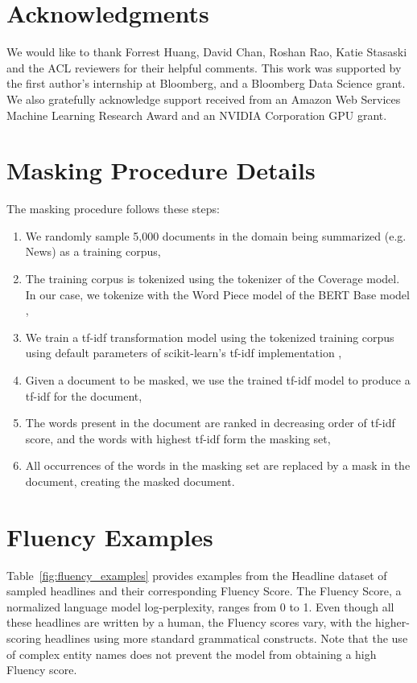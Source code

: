 \documentclass[11pt,a4paper]{article}
\begin{document}
\section*{Acknowledgments}

We would like to thank Forrest Huang, David Chan, Roshan Rao, Katie Stasaski and the ACL reviewers for their helpful comments. This work was supported by the first author's internship at Bloomberg, and a Bloomberg Data Science grant. We also gratefully acknowledge support received from an Amazon Web Services Machine Learning Research Award and an NVIDIA Corporation GPU grant.




\clearpage
\appendix
\renewcommand{\thetable}{A\arabic{table}}
\setcounter{table}{0}
\renewcommand{\thefigure}{A\arabic{figure}}
\setcounter{figure}{0}

\section{Masking Procedure Details}
\label{appendix:masking}
The masking procedure follows these steps:
\begin{enumerate}
    \item We randomly sample 5,000 documents in the domain being summarized (e.g. News) as a training corpus,
    \item The training corpus is tokenized using the tokenizer of the Coverage model. In our case, we tokenize with the Word Piece model of the BERT Base model \cite{devlin2019bert},
    \item We train a tf-idf transformation model using the tokenized training corpus using default parameters of scikit-learn's tf-idf implementation \cite{scikit-learn},
    \item Given a document to be masked, we use the trained tf-idf model to produce a tf-idf for the document,
    \item The words present in the document are ranked in decreasing order of tf-idf score, and the  words with highest tf-idf form the masking set,
    \item All occurrences of the words in the masking set are replaced by a mask in the document, creating the masked document.
\end{enumerate}

\section{Fluency Examples}
Table~\ref{fig:fluency_examples} provides examples from the Headline dataset of sampled headlines and their corresponding Fluency Score. The Fluency Score, a normalized language model log-perplexity, ranges from 0 to 1. Even though all these headlines are written by a human, the Fluency scores vary, with the higher-scoring headlines using more standard grammatical constructs. Note that the use of complex entity names does not prevent the model from obtaining a high Fluency score.
\end{document}
